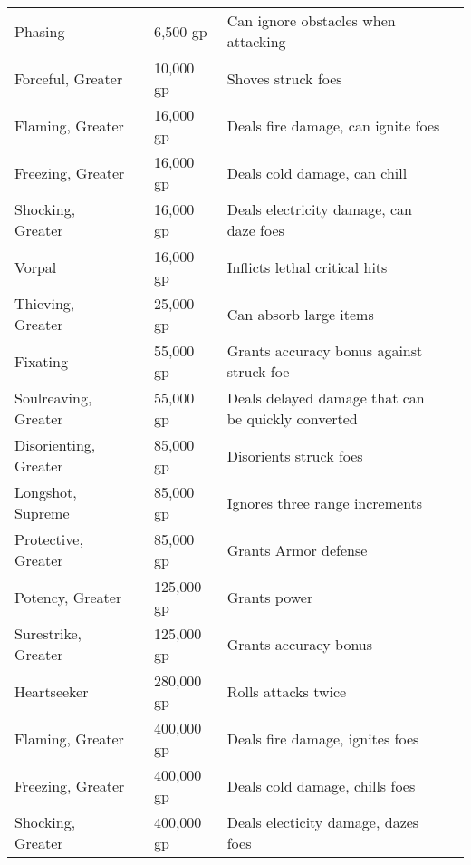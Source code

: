\begin{longtabuwrapper}
\begin{longtabu}{l l l X l}
Phasing &  & 6,500 gp & Can ignore obstacles when attacking & \pageref{item:Phasing} \\
Forceful, Greater &  & 10,000 gp & Shoves struck foes & \pageref{item:Forceful, Greater} \\
Flaming, Greater &  & 16,000 gp & Deals fire damage, can ignite foes & \pageref{item:Flaming, Greater} \\
Freezing, Greater &  & 16,000 gp & Deals cold damage, can chill & \pageref{item:Freezing, Greater} \\
Shocking, Greater &  & 16,000 gp & Deals electricity damage, can daze foes & \pageref{item:Shocking, Greater} \\
Vorpal &  & 16,000 gp & Inflicts lethal critical hits & \pageref{item:Vorpal} \\
Thieving, Greater &  & 25,000 gp & Can absorb large items & \pageref{item:Thieving, Greater} \\
Fixating &  & 55,000 gp & Grants accuracy bonus against struck foe & \pageref{item:Fixating} \\
Soulreaving, Greater &  & 55,000 gp & Deals delayed damage that can be quickly converted & \pageref{item:Soulreaving, Greater} \\
Disorienting, Greater &  & 85,000 gp & Disorients struck foes & \pageref{item:Disorienting, Greater} \\
Longshot, Supreme &  & 85,000 gp & Ignores three range increments & \pageref{item:Longshot, Supreme} \\
Protective, Greater &  & 85,000 gp & Grants  Armor defense & \pageref{item:Protective, Greater} \\
Potency, Greater &  & 125,000 gp & Grants  power & \pageref{item:Potency, Greater} \\
Surestrike, Greater &  & 125,000 gp & Grants  accuracy bonus & \pageref{item:Surestrike, Greater} \\
Heartseeker &  & 280,000 gp & Rolls attacks twice & \pageref{item:Heartseeker} \\
Flaming, Greater &  & 400,000 gp & Deals fire damage, ignites foes & \pageref{item:Flaming, Greater} \\
Freezing, Greater &  & 400,000 gp & Deals cold damage, chills foes & \pageref{item:Freezing, Greater} \\
Shocking, Greater &  & 400,000 gp & Deals electicity damage, dazes foes & \pageref{item:Shocking, Greater} \\
\end{longtabu}
\end{longtabuwrapper}
